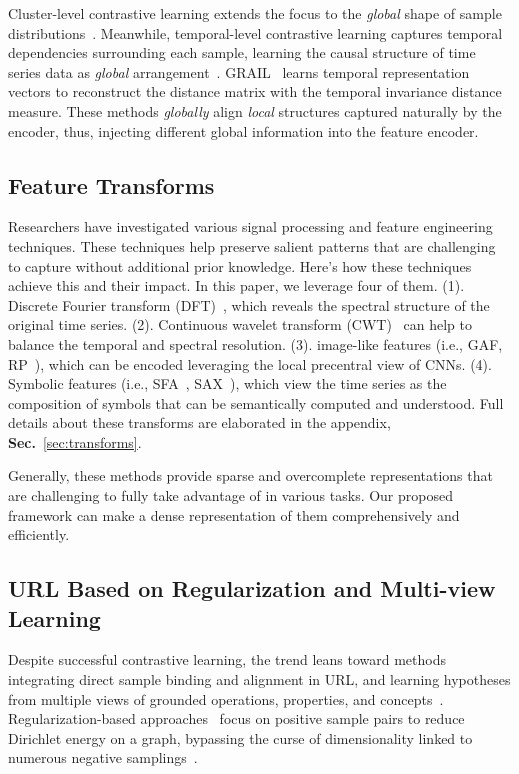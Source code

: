 Cluster-level contrastive learning extends the focus to the \textit{global} shape of sample distributions~\cite{meng2023mhccl}. Meanwhile, temporal-level contrastive learning captures temporal dependencies surrounding each sample, learning the causal structure of time series data as \textit{global} arrangement~\cite{eldele2021time}. GRAIL~\cite{paparrizos2019grail} learns temporal representation vectors to reconstruct the distance matrix with the temporal invariance distance measure. These methods \textit{globally} align \textit{local} structures captured naturally by the encoder, thus, injecting different global information into the feature encoder.

\subsection{Feature Transforms}\label{sec:transform_main}

Researchers have investigated various signal processing and feature engineering techniques. These techniques help preserve salient patterns that are challenging to capture without additional prior knowledge. Here's how these techniques achieve this and their impact. In this paper, we leverage four of them. (1). Discrete Fourier transform (DFT)~\cite{yang2022unsupervised,winograd1978computing}, which reveals the spectral structure of the original time series. (2). Continuous wavelet transform (CWT)~\cite{grossmann1990reading} can help to balance the temporal and spectral resolution. (3). image-like features (i.e., GAF, RP~\cite{wang2015encoding}), which can be encoded leveraging the local precentral view of CNNs. (4). Symbolic features (i.e., SFA~\cite{tang2020interpretable}, SAX~\cite{notaristefano2013data}), which view the time series as the composition of symbols that can be semantically computed and understood. Full details about these transforms are elaborated in the appendix, \textbf{Sec.}~\ref{sec:transforms}. 

Generally, these methods provide sparse and overcomplete representations that are challenging to fully take advantage of in various tasks. Our proposed framework can make a dense representation of them comprehensively and efficiently.


\subsection{URL Based on Regularization and Multi-view Learning}

Despite successful contrastive learning, the trend leans toward methods integrating direct sample binding and alignment in URL, and learning hypotheses from multiple views of grounded operations, properties, and concepts~\cite{girdhar2023imagebind, yariv2023audiotoken}. Regularization-based approaches~\cite{bardes2021vicreg} focus on positive sample pairs to reduce Dirichlet energy on a graph, bypassing the curse of dimensionality linked to numerous negative samplings~\cite{balestriero2022contrastive}.

